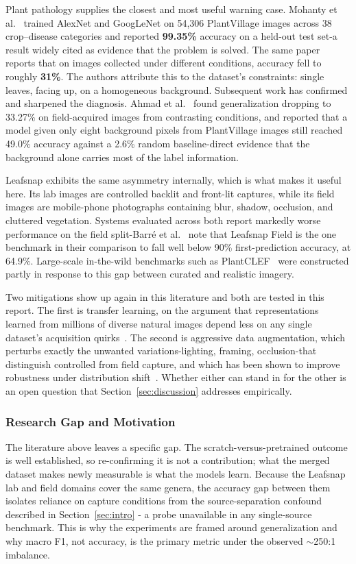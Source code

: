 \documentclass[12pt,a4paper]{article}
\begin{document}
Plant pathology supplies the closest and most useful warning case. Mohanty et al.~\cite{mohanty2016} trained AlexNet and GoogLeNet on 54{,}306 PlantVillage images across 38 crop--disease categories and reported \textbf{99.35\%} accuracy on a held-out test set-a result widely cited as evidence that the problem is solved. The same paper reports that on images collected under different conditions, accuracy fell to roughly \textbf{31\%}. The authors attribute this to the dataset's constraints: single leaves, facing up, on a homogeneous background. Subsequent work has confirmed and sharpened the diagnosis. Ahmad et al.~\cite{ahmad2023} found generalization dropping to 33.27\% on field-acquired images from contrasting conditions, and reported that a model given only eight background pixels from PlantVillage images still reached 49.0\% accuracy against a 2.6\% random baseline-direct evidence that the background alone carries most of the label information.

Leafsnap exhibits the same asymmetry internally, which is what makes it useful here. Its lab images are controlled backlit and front-lit captures, while its field images are mobile-phone photographs containing blur, shadow, occlusion, and cluttered vegetation. Systems evaluated across both report markedly worse performance on the field split-Barr\'e et al.~\cite{barre2017} note that Leafsnap Field is the one benchmark in their comparison to fall well below 90\% first-prediction accuracy, at 64.9\%. Large-scale in-the-wild benchmarks such as PlantCLEF~\cite{goeau2017} were constructed partly in response to this gap between curated and realistic imagery.

Two mitigations show up again in this literature and both are tested in this report. The first is transfer learning, on the argument that representations learned from millions of diverse natural images depend less on any single dataset's acquisition quirks~\cite{yosinski2014}. The second is aggressive data augmentation, which perturbs exactly the unwanted variations-lighting, framing, occlusion-that distinguish controlled from field capture, and which has been shown to improve robustness under distribution shift~\cite{hendrycks2020,zhang2018,yun2019}. Whether either can stand in for the other is an open question that Section~\ref{sec:discussion} addresses empirically.

\subsubsection{Research Gap and Motivation}
The literature above leaves a specific gap. The scratch-versus-pretrained outcome is well established, so re-confirming it is not a contribution; what the merged dataset makes newly measurable is what the models learn. Because the Leafsnap lab and field domains cover the same genera, the accuracy gap between them isolates reliance on capture conditions from the source-separation confound described in Section~\ref{sec:intro} - a probe unavailable in any single-source benchmark. This is why the experiments are framed around generalization and why macro F1, not accuracy, is the primary metric under the observed $\sim$250:1 imbalance.
\end{document}
